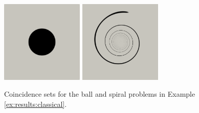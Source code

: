 \documentclass[review,hidelinks,onefignum,onetabnum]{siamart220329}
\begin{document}
\begin{figure}[ht]
\centering
\includegraphics[width=0.35\textwidth]{fixfigs/ball-set.png} \qquad \includegraphics[width=0.35\textwidth]{fixfigs/spiral-set.png}
\caption{Coincidence sets for the ball and spiral problems in Example \ref{ex:results:classical}.}
\label{fig:results:classical}
\end{figure}
\end{document}
